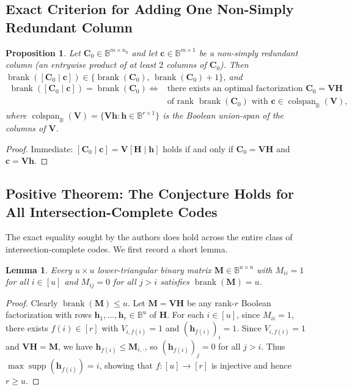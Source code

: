 \documentclass[11pt]{article}
\theoremstyle{plain}
\newtheorem{lemma}[theorem]{Lemma}
\newtheorem{proposition}[theorem]{Proposition}
\theoremstyle{definition}
\theoremstyle{remark}
\DeclareMathOperator{\brank}{brank}
\DeclareMathOperator{\supp}{supp}
\DeclareMathOperator{\colspan}{colspan}
\begin{document}
\subsection{Exact Criterion for Adding One Non-Simply Redundant Column}

\begin{proposition}\label{prop:criterion}
Let $\mathbf{C}_0 \in \mathbb{B}^{m \times n_0}$ and let $\mathbf{c} \in \mathbb{B}^{m \times 1}$ be a non-simply redundant column (an entrywise product of at least $2$ columns of $\mathbf{C}_0$). Then $\brank([\mathbf{C}_0 \mid \mathbf{c}]) \in \{\brank(\mathbf{C}_0),\, \brank(\mathbf{C}_0) + 1\}$, and
\begin{align*}
\brank([\mathbf{C}_0 \mid \mathbf{c}]) = \brank(\mathbf{C}_0)
\iff{}& \text{there exists an optimal factorization } \mathbf{C}_0 = \mathbf{V}\mathbf{H} \\
&\text{of rank } \brank(\mathbf{C}_0) \text{ with } \mathbf{c} \in \colspan_{\mathbb{B}}(\mathbf{V}),
\end{align*}
where $\colspan_{\mathbb{B}}(\mathbf{V}) = \{\mathbf{V}\mathbf{h} : \mathbf{h} \in \mathbb{B}^{r \times 1}\}$ is the Boolean union-span of the columns of $\mathbf{V}$.
\end{proposition}

\begin{proof}
Immediate: $[\mathbf{C}_0 \mid \mathbf{c}] = \mathbf{V}[\mathbf{H} \mid \mathbf{h}]$ holds if and only if $\mathbf{C}_0 = \mathbf{V}\mathbf{H}$ and $\mathbf{c} = \mathbf{V}\mathbf{h}$.
\end{proof}

\subsection{Positive Theorem: The Conjecture Holds for All Intersection-Complete Codes}

The exact equality sought by the authors does hold across the entire class of intersection-complete codes. We first record a short lemma.

\begin{lemma}\label{lem:lowertri}
Every $u \times u$ lower-triangular binary matrix $\mathbf{M} \in \mathbb{B}^{u \times u}$ with $M_{ii} = 1$ for all $i \in [u]$ and $M_{ij} = 0$ for all $j > i$ satisfies $\brank(\mathbf{M}) = u$.
\end{lemma}

\begin{proof}
Clearly $\brank(\mathbf{M}) \le u$. Let $\mathbf{M} = \mathbf{V}\mathbf{H}$ be any rank-$r$ Boolean factorization with rows $\mathbf{h}_1, \dots, \mathbf{h}_r \in \mathbb{B}^u$ of $\mathbf{H}$. For each $i \in [u]$, since $M_{ii} = 1$, there exists $f(i) \in [r]$ with $V_{i, f(i)} = 1$ and $(\mathbf{h}_{f(i)})_i = 1$. Since $V_{i, f(i)} = 1$ and $\mathbf{V}\mathbf{H} = \mathbf{M}$, we have $\mathbf{h}_{f(i)} \le \mathbf{M}_{i,\cdot}$, so $(\mathbf{h}_{f(i)})_j = 0$ for all $j > i$. Thus $\max \supp(\mathbf{h}_{f(i)}) = i$, showing that $f : [u] \to [r]$ is injective and hence $r \ge u$.
\end{proof}
\end{document}
